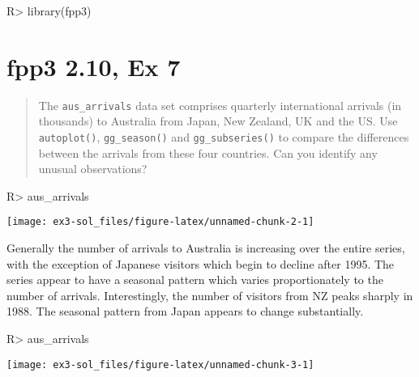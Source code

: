 \documentclass[
]{article}
\author{
\\
}
\title{}
\begin{document}
\begin{CodeChunk}
\begin{CodeInput}
R> library(fpp3)
\end{CodeInput}
\end{CodeChunk}

\hypertarget{fpp3-2.10-ex-7}{%
\section{fpp3 2.10, Ex 7}\label{fpp3-2.10-ex-7}}

\begin{quote}
The \texttt{aus\_arrivals} data set comprises quarterly international arrivals (in thousands) to Australia from Japan, New Zealand, UK and the US. Use \texttt{autoplot()}, \texttt{gg\_season()} and \texttt{gg\_subseries()} to compare the differences between the arrivals from these four countries. Can you identify any unusual observations?
\end{quote}

\begin{CodeChunk}
\begin{CodeInput}
R> aus_arrivals %
\end{CodeInput}


\begin{center}\texttt{[image: ex3-sol\_files/figure-latex/unnamed-chunk-2-1]} \end{center}

\end{CodeChunk}

Generally the number of arrivals to Australia is increasing over the entire series, with the exception of Japanese visitors which begin to decline after 1995. The series appear to have a seasonal pattern which varies proportionately to the number of arrivals. Interestingly, the number of visitors from NZ peaks sharply in 1988. The seasonal pattern from Japan appears to change substantially.

\begin{CodeChunk}
\begin{CodeInput}
R> aus_arrivals %
\end{CodeInput}


\begin{center}\texttt{[image: ex3-sol\_files/figure-latex/unnamed-chunk-3-1]} \end{center}

\end{CodeChunk}
\end{document}
